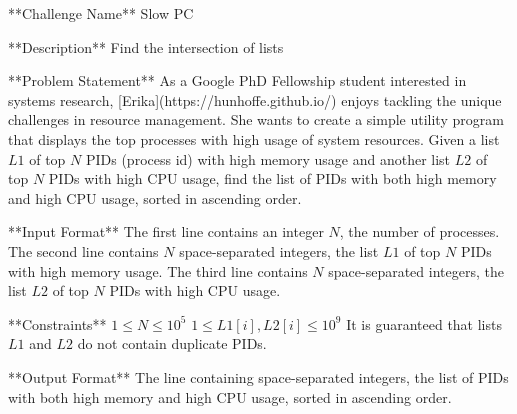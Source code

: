 **Challenge Name**  
Slow PC

**Description**  
Find the intersection of lists

**Problem Statement**  
As a Google PhD Fellowship student interested in systems research, [Erika](https://hunhoffe.github.io/) enjoys tackling the unique challenges in resource management. She wants to create a simple utility program that displays the top processes with high usage of system resources.  
Given a list $L1$ of top $N$ PIDs (process id) with high memory usage and another list $L2$ of top $N$ PIDs with high CPU usage, find the list of PIDs with both high memory and high CPU usage, sorted in ascending order.

**Input Format**  
The first line contains an integer $N$, the number of processes.  
The second line contains $N$ space-separated integers, the list $L1$ of top $N$ PIDs with high memory usage.  
The third line contains $N$ space-separated integers, the list $L2$ of top $N$ PIDs with high CPU usage.  

**Constraints**  
$1 \leq N \leq 10^5$  
$1 \leq L1[i], L2[i] \leq 10^9$  
It is guaranteed that lists $L1$ and $L2$ do not contain duplicate PIDs.

**Output Format**  
The line containing space-separated integers, the list of PIDs with both high memory and high CPU usage, sorted in ascending order.